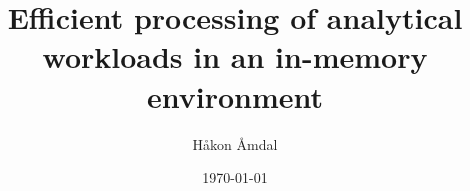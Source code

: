 \title{Efficient processing of analytical workloads in an in-memory environment}
\author{Håkon Åmdal}
\date{\today}
